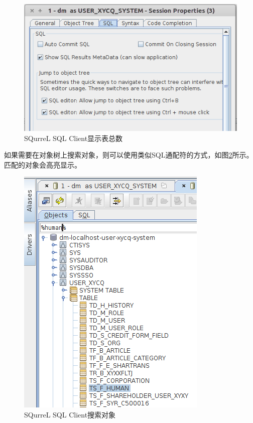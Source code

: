 \documentclass[12pt]{book}
\numberwithin{dummy}{section}
\theoremstyle{ocrenumbox}
\theoremstyle{blacknumex}
\theoremstyle{blacknumbox}
\theoremstyle{ocrenum}
\begin{document}
\begin{figure}[htbp]
	\centering
	\includegraphics[scale=0.4]{showtableresultcount.png}
	\caption{SQurreL SQL Client显示表总数}
	\label{fig:showtableresultcount}
\end{figure}

如果需要在对象树上搜索对象，则可以使用类似SQL通配符的方式，如图\ref{fig:searchobject}所示。匹配的对象会高亮显示。

\begin{figure}[htbp]
	\centering
	\includegraphics[scale=0.4]{searchobject.png}
	\caption{SQurreL SQL Client搜索对象}
	\label{fig:searchobject}
\end{figure}
\end{document}
